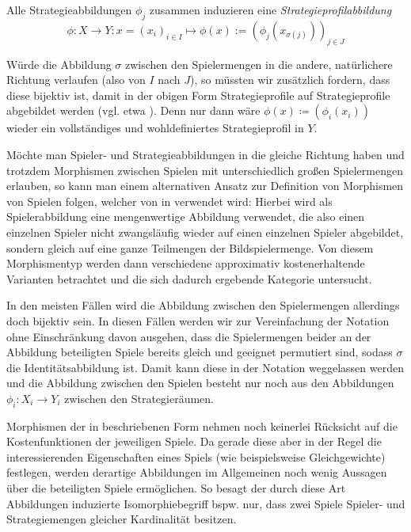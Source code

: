 \begin{bem}
	Alle Strategieabbildungen $\phi_j$ zusammen induzieren eine \emph{Strategieprofilabbildung}
	\[\phi: X \to Y: x=(x_i)_{i\in I} \mapsto \phi(x) := \left(\phi_j(x_{\sigma(j)})\right)_{j \in J} \]
\end{bem}

Würde die Abbildung $\sigma$ zwischen den Spielermengen in die andere, \glqq natürlichere\grqq{} Richtung verlaufen (also von $I$ nach $J$), so müssten wir zusätzlich fordern, dass diese bijektiv ist, damit in der obigen Form Strategieprofile auf Strategieprofile abgebildet werden (vgl. etwa \cite{CatGameTheory}). Denn nur dann wäre $\phi(x) \coloneqq \left(\phi_i(x_i)\right)$ wieder ein vollständiges und wohldefiniertes Strategieprofil in $Y$.

\begin{bem}
	Möchte man Spieler- und Strategieabbildungen in die gleiche Richtung haben und trotzdem Morphismen zwischen Spielen mit unterschiedlich großen Spielermengen erlauben, so kann man einem alternativen Ansatz zur Definition von Morphismen von Spielen folgen, welcher von \citeauthor{Foundations} in \cite[Kapitel 1, Abschnitt 1.14]{Foundations} verwendet wird: Hierbei wird als Spielerabbildung eine mengenwertige Abbildung verwendet, die also einen einzelnen Spieler nicht zwangsläufig wieder auf einen einzelnen Spieler abgebildet, sondern gleich auf eine ganze Teilmengen der Bildspielermenge. Von diesem Morphismentyp werden dann verschiedene \glqq approximativ kostenerhaltende\grqq{} Varianten betrachtet und die sich dadurch ergebende Kategorie untersucht.
\end{bem}

\begin{notation}
	In den meisten Fällen wird die Abbildung zwischen den Spielermengen allerdings doch bijektiv sein. In diesen Fällen werden wir zur Vereinfachung der Notation ohne Einschränkung davon ausgehen, dass die Spielermengen beider an der Abbildung beteiligten Spiele bereits gleich und geeignet permutiert sind, sodass $\sigma$ die Identitätsabbildung ist. Damit kann diese in der Notation weggelassen werden und die Abbildung zwischen den Spielen besteht nur noch aus den Abbildungen $\phi_i: X_i \to Y_i$ zwischen den Strategieräumen.
\end{notation}

Morphismen der in  beschriebenen Form nehmen noch keinerlei Rücksicht auf die Kostenfunktionen der jeweiligen Spiele. Da gerade diese aber in der Regel die interessierenden Eigenschaften eines Spiels (wie beispielsweise Gleichgewichte) festlegen, werden derartige Abbildungen im Allgemeinen noch wenig Aussagen über die beteiligten Spiele ermöglichen. So besagt der durch diese Art Abbildungen induzierte Isomorphiebegriff bspw. nur, dass zwei Spiele Spieler- und Strategiemengen gleicher Kardinalität besitzen.

